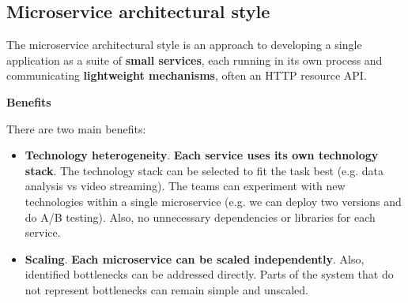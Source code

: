 \subsection{Microservice architectural style}

The microservice architectural style is an approach to developing a single application as a suite of \textbf{small services}, each running in its own process and communicating \textbf{lightweight mechanisms}, often an HTTP resource API.

\begin{flushleft}
    \textcolor{Green3}{\textbf{ Benefits}}
\end{flushleft}
There are two main benefits:
\begin{itemize}
    \item \textbf{Technology heterogeneity}. \textbf{Each service uses its own technology stack}. The technology stack can be selected to fit the task best (e.g. data analysis vs video streaming). The teams can experiment with new technologies within a single microservice (e.g. we can deploy two versions and do A/B testing). Also, no unnecessary dependencies or libraries for each service.
    
    \item \textbf{Scaling}. \textbf{Each microservice can be scaled independently}. Also, identified bottlenecks can be addressed directly. Parts of the system that do not represent bottlenecks can remain simple and unscaled.
\end{itemize}